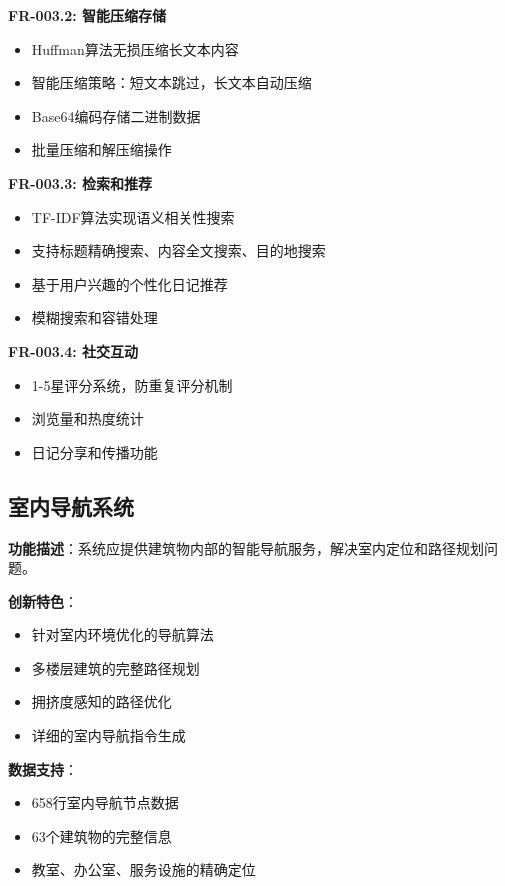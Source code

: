 \documentclass[12pt,a4paper]{article}
\begin{document}
\textbf{FR-003.2: 智能压缩存储}
\begin{itemize}
    \item Huffman算法无损压缩长文本内容
    \item 智能压缩策略：短文本跳过，长文本自动压缩
    \item Base64编码存储二进制数据
    \item 批量压缩和解压缩操作
\end{itemize}

\textbf{FR-003.3: 检索和推荐}
\begin{itemize}
    \item TF-IDF算法实现语义相关性搜索
    \item 支持标题精确搜索、内容全文搜索、目的地搜索
    \item 基于用户兴趣的个性化日记推荐
    \item 模糊搜索和容错处理
\end{itemize}

\textbf{FR-003.4: 社交互动}
\begin{itemize}
    \item 1-5星评分系统，防重复评分机制
    \item 浏览量和热度统计
    \item 日记分享和传播功能
\end{itemize}

\subsection{室内导航系统}

\begin{reqbox}[title={FR-004: 室内导航服务}]
\textbf{功能描述}：系统应提供建筑物内部的智能导航服务，解决室内定位和路径规划问题。

\textbf{创新特色}：
\begin{itemize}[nosep]
    \item 针对室内环境优化的导航算法
    \item 多楼层建筑的完整路径规划
    \item 拥挤度感知的路径优化
    \item 详细的室内导航指令生成
\end{itemize}

\textbf{数据支持}：
\begin{itemize}[nosep]
    \item 658行室内导航节点数据
    \item 63个建筑物的完整信息
    \item 教室、办公室、服务设施的精确定位
\end{itemize}
\end{reqbox}
\end{document}
